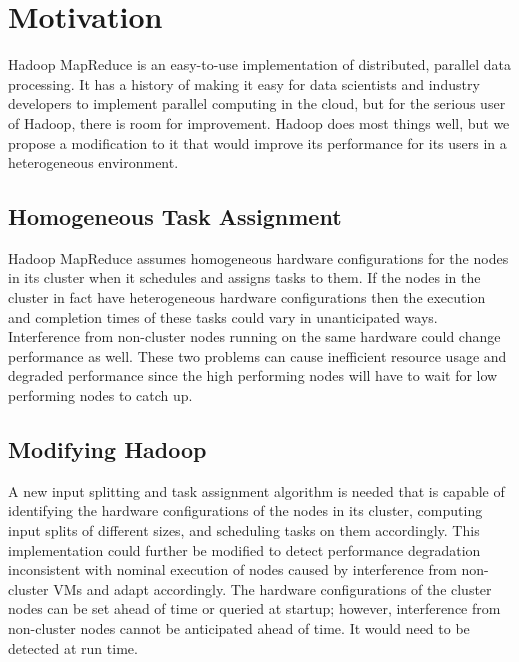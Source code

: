 \section{Motivation}
\label{section:motivation}
Hadoop MapReduce is an easy-to-use implementation of distributed, parallel data
processing. It has a history of making it easy for data scientists and industry
developers to implement parallel computing in the cloud, but for the serious
user of Hadoop, there is room for improvement. Hadoop does most things well,
but we propose a modification to it that would improve its performance for its
users in a heterogeneous environment.

\subsection{Homogeneous Task Assignment}
Hadoop MapReduce assumes homogeneous hardware configurations for the nodes in
its cluster when it schedules and assigns tasks to them. If the nodes in the
cluster in fact have heterogeneous hardware configurations then the execution
and completion times of these tasks could vary in unanticipated ways.
Interference from non-cluster nodes running on the same hardware
could change performance as well. These two problems can cause inefficient
resource usage and degraded performance since the high performing nodes
will have to wait for low performing nodes to catch up.

\subsection{Modifying Hadoop}
A new input splitting and task assignment algorithm is needed that is capable of
identifying the hardware configurations of the nodes in its cluster, computing
input splits of different sizes, and scheduling tasks on them accordingly.
This implementation could further be modified to detect performance degradation
inconsistent with nominal execution of nodes caused by interference from non-cluster
VMs and adapt accordingly. The hardware
configurations of the cluster nodes can be set ahead of time or queried at startup; however,
interference from non-cluster nodes cannot be anticipated ahead of time. It would
need to be detected at run time.
